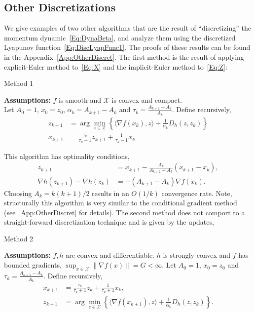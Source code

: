 \documentclass[11pt]{article}
\theoremstyle{plain}
\newcommand{\X}{{\mathcal X}}
\begin{document}
\subsection{Other Discretizations}
We give examples of two other algorithms that are the result of ``discretizing'' the momentum dynamic~\eqref{Eq:DynaBeta}, and analyze them using the discretized Lyapunov function~\eqref{Eq:DiscLyapFunc1}. The proofs of these results can be found in the Appendix~\ref{App:OtherDiscret}. The first method is the result of applying explicit-Euler method to~\eqref{Eq:X} and the implicit-Euler method to~\eqref{Eq:Z}:
\begin{algorithm}[H]
\caption{Method 1}
{\bf Assumptions:} $f$ is smooth and $\X$ is convex and compact. \\
Let $A_0 = 1$, $x_0 = z_0$, $\alpha_k = A_{k+1} - A_k$ and $\tau_k = \frac{A_{k+1}- A_k}{A_{k}}$. Define recursively,
\begin{subequations}\label{Eq:QuasiSub2}
\begin{align}
z_{k+1} &= \arg \min_{z \in \X} \left\{\langle \nabla f(x_k),z \rangle + \frac{1}{\alpha_k} D_h(z, z_k)\right\}\\
x_{k+1} &= \frac{\tau_k}{\tau_k - 1}z_{k+1} + \frac{1}{\tau_k - 1}  x_k
\end{align} 
\end{subequations}
\end{algorithm}
\noindent This algorithm has optimality conditions,
\begin{subequations}
\begin{align}
z_{k+1} &= x_{k+1} - \frac{A_{k}}{A_{k+1} -A_{k}} (x_{k+1} - x_k),\label{Eq:ZSeqOther1}\\
\nabla h(z_{k+1}) -\nabla h(z_k) &= -(A_{k+1} - A_{k})\nabla f(x_{k}) \label{Eq:XSeqOther1}.
\end{align}
\end{subequations}
\noindent Choosing $A_k = k(k+1)/2$ results in an $O(1/k)$ convergence rate. Note, structurally this algorithm is very similar to the conditional gradient method (see~\ref{App:OtherDiscret} for details). The second method does not comport to a straight-forward discretization technique and is given by the updates,
\begin{algorithm}[H]
\caption{Method 2}
{\bf Assumptions:} $f, h$ are convex and differentiable. $h$ is strongly-convex and $f$ has bounded gradients, $\sup_{x\in\X}\|\nabla f(x)\| = G <\infty$. 
Let $A_0 = 1$, $x_0 = z_0$ and $\tau_k = \frac{A_{k+1}- A_k}{A_{k}}$. Define recursively,
\begin{subequations}\label{Eq:QuasiSub3}
\begin{align}
x_{k+1}  &= \frac{\tau_k}{\tau_k + 1} z_k + \frac{1}{\tau_k+1}x_k,\\%
z_{k+1} &= \arg \min_{z \in \X} \left\{\langle \nabla f(x_{k+1}),z\rangle + \frac{1}{\alpha_k} D_h(z, z_k)\right\}.
\end{align} 
\end{subequations}
\end{algorithm}
\end{document}
